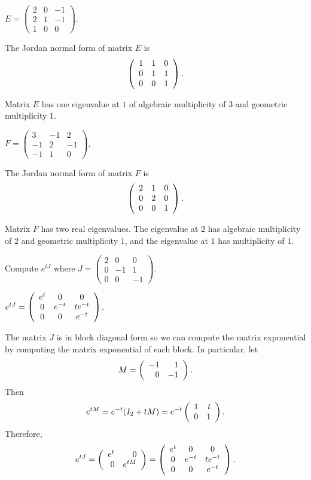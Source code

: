 \documentclass{ximera}
\begin{document}
\begin{exercise} \label{c10.5.4b}
$E = \left(\begin{array}{rrr} 2 & 0 & -1 \\  2 & 1 & -1 \\
1 & 0 & 0 \end{array}\right)$.

\begin{solution}
\ans The Jordan normal form of matrix $E$ is
\[
\left(\begin{array}{rrr} 1 & 1 & 0 \\ 0 & 1 & 1 \\ 0 & 0 & 1\end{array}\right).
\]

\soln Matrix $E$ has one eigenvalue at $1$ of algebraic multiplicity of $3$ and 
geometric multiplicity $1$.

\end{solution}
\end{exercise}
\begin{exercise} \label{c10.5.4c}
$F = \left(\begin{array}{rrr} 3 & -1 & 2 \\  -1 & 2 & -1 \\
-1 & 1 & 0 \end{array}\right)$.

\begin{solution}
\ans The Jordan normal form of matrix $F$ is
\[
\left(\begin{array}{rrr} 2 & 1 & 0 \\ 0 & 2 & 0 \\ 0 & 0 & 1\end{array}\right).
\]

\soln Matrix $F$ has two real eigenvalues.  The eigenvalue at $2$ has
algebraic multiplicity of $2$ and geometric multiplicity $1$, and the eigenvalue at 
$1$ has multiplicity of $1$.

\end{solution}
\end{exercise}

\begin{exercise}  \label{c10.5.5A}
Compute $e^{tJ}$ where $J=\left(\begin{array}{rrr} 2 & 0 & 0 \\  0 & -1 & 1 \\
0 & 0 & -1 \end{array}\right)$.

\begin{solution}
\ans $e^{tJ} =
\left(\begin{array}{ccc} e^t & 0 & 0 \\ 0 & e^{-t} & te^{-t} \\ 0 & 0 & e^{-t}\end{array}\right)$.

\soln The matrix $J$ is in block diagonal form so we can compute the matrix exponential 
by computing the matrix exponential of each block.  In particular, let 
\[
M = \left(\begin{array}{rr} -1 & 1\\ 0 &-1\end{array}\right).
\]
Then 
\[
e^{tM} = e^{-t}(I_2+tM) = e^{-t}\left(\begin{array}{rr} 1 & t\\ 0 &1\end{array}\right).
\]
Therefore,
\[
e^{tJ} = \left(\begin{array}{rr} e^t & 0\\ 0 &e^{tM}\end{array}\right) = 
\left(\begin{array}{ccc} e^t & 0 & 0 \\ 0 & e^{-t} & te^{-t} \\ 0 & 0 & e^{-t}\end{array}\right).
\]

\end{solution}
\end{exercise}
\end{document}
